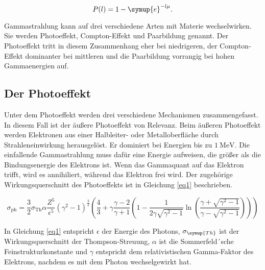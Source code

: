 \begin{equation}
    P(l) = 1 - \symup{e}^{-l\mu}.
    \label{2.2}
\end{equation}

Gammastrahlung kann auf drei verschiedene Arten mit Materie wechselwirken.
Sie werden Photoeffekt, Compton-Effekt und Paarbildung genannt.
Der Photoeffekt tritt in diesem Zusammenhang eher bei niedrigeren, der 
Compton-Effekt dominanter bei mittleren und die Paarbildung vorrangig
bei hohen Gammaenergien auf.

\subsection{Der Photoeffekt}
Unter dem Photoeffekt werden drei verschiedene Mechanismen zusammengefasst.
In diesem Fall ist der äußere Photoeffekt von Relevanz.
Beim äußeren Photoeffekt werden Elektronen aus einer Halbleiter- oder Metalloberfläche 
durch Strahleneinwirkung herausgelöst. 
Er dominiert bei Energien bis zu $\SI{1}{\mega\eV}$.
Die einfallende Gammastrahlung muss dafür eine Energie aufweisen, die größer als die 
Bindungsenergie des Elektrons ist. Wenn das Gammaquant auf das Elektron trifft, wird es 
annihiliert, während das Elektron frei wird. Der zugehörige 
Wirkungsquerschnitt des Photoeffekts ist in Gleichung \ref{eq1} beschrieben.

\begin{equation}
    \sigma_{\text{ph}} = \frac{3}{2} \sigma_{\text{Th}} \alpha \frac{Z^5}{\epsilon^5} (\gamma^2 -1)^{\frac{3}{2}} \left(\frac{4}{3} + \gamma\frac{\gamma -2}{\gamma+1} \left(1 - \frac{1}{2 \gamma \sqrt{\gamma^2 -1}} \ln\left(\frac{\gamma + \sqrt{\gamma^2 - 1}}{\gamma - \sqrt{\gamma^2 -1}} \right) \right) \right)
    \label{eq1}
\end{equation}

In Gleichung \ref{eq1} entspricht $\epsilon$ der Energie des Photons, $\sigma_{\symup{Th}}$
ist der Wirkungsquerschnitt der Thompson-Streuung, $\alpha$ ist die 
Sommerfeld´sche Feinstrukturkonstante und $\gamma$ entspricht dem relativistischen 
Gamma-Faktor des Elektrons, nachdem es mit dem Photon wechselgewirkt hat.

